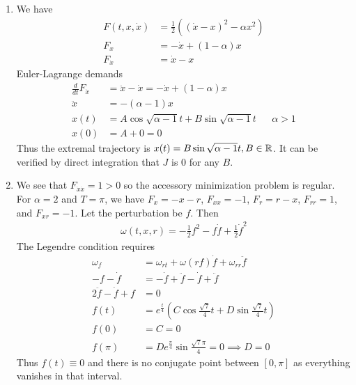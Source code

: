 \documentclass[12pt]{article}
\begin{document}
\begin{problem}[5]
\begin{enumerate}[label=(\alph*)]
	\item 
We have
\begin{align*}
	F(t,x,\dot{x}) &= \frac{1}{2}((\dot{x}-x)^2- \alpha x^2) \\
	F_x &= -\dot{x} + (1- \alpha)x\\
	F_{\dot{x}} &= \dot{x}-x
\end{align*}
Euler-Lagrange demands
\begin{align*}
	\frac{d}{dt} F_{\dot{x}} &= \ddot{x} - \dot{x} =-\dot{x}+(1- \alpha) x\\
	\ddot{x} &= -( \alpha-1) x\\
	x(t) &= A \cos \sqrt{ \alpha-1}t + B \sin \sqrt{ \alpha-1}t &&  \alpha>1  \\
	x(0) &= A+0 = 0
\end{align*}
Thus the extremal trajectory is $ x(t) = B \sin \sqrt{ \alpha-1}t, B \in \mathbb{R} $. It can be verified by direct integration that $ J$ is 0 for any  $ B$.
\item We see that $ F_{\dot{x}\dot{x}} = 1 >0$ so the accessory minimization problem is regular. For  $ \alpha=2$ and  $ T=\pi$, we have $ F_x = -x-r$, $F_{x x}=-1 $, $ F_r = r-x$,  $ F_{r r}= 1$, and $ F_{xr}=-1$. Let the perturbation be $ f$. Then
\begin{align*}
	\omega(t,x,r) = -\frac{1}{2} f^2-f \dot{f}+\frac{1}{2} \dot{f}^2
\end{align*}
The Legendre condition requires
\begin{align*}
	\omega_f &= \omega_{rt} + \omega(rf) \dot{f} + \omega_{r r} \ddot{f}\\
	-f -\dot{f} &= -\dot{f} + \ddot{f}-\dot{f} + \ddot{f}\\
	2 \ddot{f} -\dot{f} + f &= 0 \\
	f(t) &= e^{\frac{t}{4}} \left( C \cos \frac{\sqrt{7} }{ 4}t + D \sin \frac{\sqrt{7} }{ 4}t \right)  \\
	f(0) &= C = 0 \\
	f(\pi) &= D e^{\frac{\pi}{4}} \sin \frac{\sqrt{7} \pi}{ 4} =0  \implies D = 0
\end{align*}
Thus $ f(t) \equiv 0$ and there is no conjugate point between  $ [0,\pi]$ as everything vanishes in that interval. 
\end{enumerate}
\end{problem}
\end{document}

